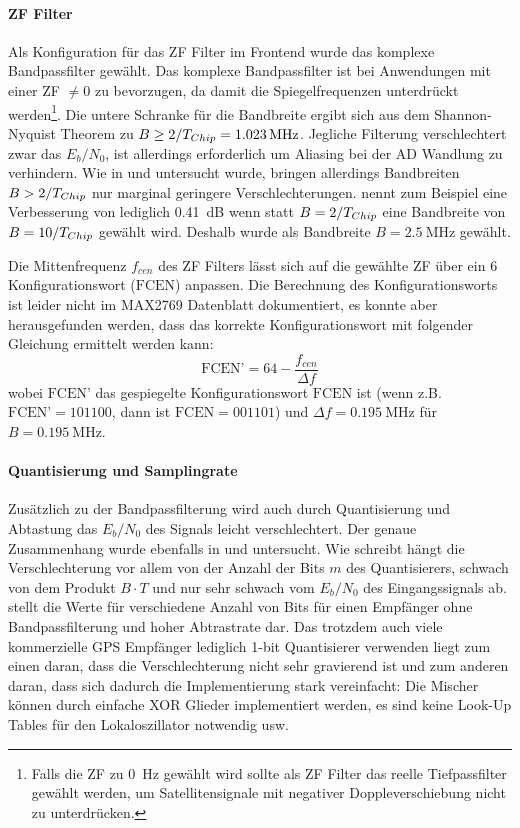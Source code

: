 \paragraph{ZF Filter}
Als Konfiguration für das ZF Filter im Frontend wurde das komplexe Bandpassfilter gewählt. Das komplexe Bandpassfilter ist bei Anwendungen mit einer ZF $\neq 0$ zu bevorzugen, da damit die Spiegelfrequenzen unterdrückt werden\footnote{Falls die ZF zu \SI{0}{\Hz} gewählt wird sollte als ZF Filter das reelle Tiefpassfilter gewählt werden, um Satellitensignale mit negativer Doppleverschiebung nicht zu unterdrücken.}. Die untere Schranke für die Bandbreite ergibt sich aus dem Shannon-Nyquist Theorem zu $B\geq 2/\gpsTchip=\SI{1.023}{\MHz}$. Jegliche Filterung verschlechtert zwar das $E_b/N_0$, ist allerdings erforderlich um Aliasing bei der AD Wandlung zu verhindern. Wie in \cite{hegarty2011analytical} und \cite{itc1982chang} untersucht wurde, bringen allerdings Bandbreiten $B>2/{T}_{Chip}$ nur marginal geringere Verschlechterungen. \cite{hegarty2011analytical} nennt zum Beispiel eine Verbesserung von lediglich \SI{0.41}{\dB} wenn statt $B=2/{T}_{Chip}$ eine Bandbreite von $B=10/{T}_{Chip}$ gewählt wird. Deshalb wurde als Bandbreite $B=\SI{2.5}{\MHz}$ gewählt.

Die Mittenfrequenz $f_{cen}$ des ZF Filters lässt sich auf die gewählte ZF über ein \SI{6}{\bit} Konfigurationswort ($\textrm{FCEN}$) anpassen. Die Berechnung des Konfigurationsworts ist leider nicht im MAX2769 Datenblatt dokumentiert, es konnte aber herausgefunden werden, dass das korrekte Konfigurationswort mit folgender Gleichung ermittelt werden kann: 
\begin{equation}
    \textrm{FCEN'} = 64 - \frac{f_{cen}}{\Delta f}
\end{equation}
wobei $\textrm{FCEN'}$ das gespiegelte Konfigurationswort $\textrm{FCEN}$ ist (wenn z.B. $\textrm{FCEN'}=101100$, dann ist $\textrm{FCEN}=001101$) und $\Delta f=\SI{0.195}{\MHz}$  für $B=\SI{0.195}{\MHz}$.

\paragraph{Quantisierung und Samplingrate}
Zusätzlich zu der Bandpassfilterung wird auch durch Quantisierung und Abtastung das $E_b/N_0$  des Signals leicht verschlechtert. Der genaue Zusammenhang wurde ebenfalls in \cite{hegarty2011analytical} und \cite{itc1982chang} untersucht. Wie \cite{itc1982chang} schreibt hängt die Verschlechterung vor allem von der Anzahl der Bits $m$ des Quantisierers, schwach von dem Produkt $B\cdot T$ und nur sehr schwach vom $E_b/N_0$ des Eingangssignals ab.  stellt die Werte für verschiedene Anzahl von Bits für einen Empfänger ohne Bandpassfilterung und hoher Abtrastrate dar. Das trotzdem auch viele kommerzielle GPS Empfänger lediglich 1-bit Quantisierer verwenden liegt zum einen daran, dass die Verschlechterung nicht sehr gravierend ist und zum anderen daran, dass sich dadurch die Implementierung stark vereinfacht: Die Mischer können durch einfache XOR Glieder implementiert werden, es sind keine Look-Up Tables für den Lokaloszillator notwendig usw. 

